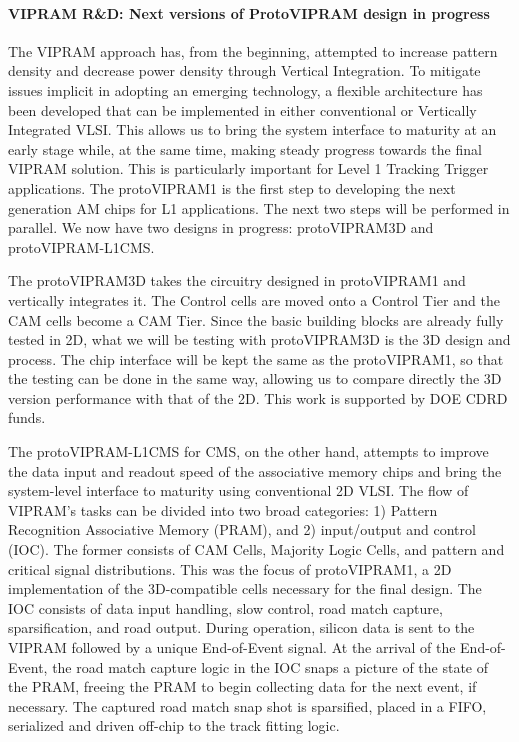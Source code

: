 \paragraph{VIPRAM R\&D: Next versions of ProtoVIPRAM design in progress}

The VIPRAM approach has, from the beginning, attempted to increase pattern density and decrease power density through Vertical Integration.   To mitigate issues implicit in adopting an emerging technology, a flexible architecture has been developed that can be implemented in either conventional or Vertically Integrated VLSI.  This allows us to bring the system interface to maturity at an early stage while, at the same time, making steady progress towards the final VIPRAM solution.  This is particularly important for Level 1 Tracking Trigger applications. The protoVIPRAM1 is the first step to developing the next generation AM chips for L1 applications. 
The next two steps will be performed in parallel. We now have two designs in progress:  protoVIPRAM3D and protoVIPRAM-L1CMS.

The protoVIPRAM3D takes the circuitry designed in protoVIPRAM1 and vertically integrates it.  The Control cells are moved onto a Control Tier and the CAM cells become a CAM Tier.  Since the basic building blocks are already fully tested in 2D, what we will be testing with protoVIPRAM3D is the 3D design and process. The chip interface will be kept the same as the protoVIPRAM1, so that the testing can be done in the same way, allowing us to compare directly the 3D version performance with that of the 2D. This work is supported by DOE CDRD funds.

The protoVIPRAM-L1CMS for CMS, on the other hand, attempts to improve the data input and readout speed of the associative memory chips and bring the system-level interface to maturity using conventional 2D VLSI. The flow of VIPRAM’s tasks can be divided into two broad categories: 1) Pattern Recognition Associative Memory (PRAM), and 2) input/output and control (IOC).  The former consists of CAM Cells, Majority Logic Cells, and pattern and critical signal distributions.  This was the focus of protoVIPRAM1, a 2D implementation of the 3D-compatible cells necessary for the final design.  The IOC consists of data input handling, slow control, road match capture, sparsification, and road output.  During operation, silicon data is sent to the VIPRAM followed by a unique End-of-Event signal.  At the arrival of the End-of-Event, the road match capture logic in the IOC snaps a picture of the state of the PRAM, freeing the PRAM to begin collecting data for the next event, if necessary.  The captured road match snap shot is sparsified, placed in a FIFO, serialized and driven off-chip to the track fitting logic.

